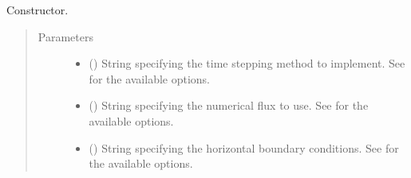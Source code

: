 \documentclass[letterpaper,10pt,english]{sphinxmanual}
\begin{document}
\begin{fulllineitems}
\begin{fulllineitems}
\end{fulllineitems}


\begin{fulllineitems}
\label{\detokenize{api:tasmania.dycore.dycore_isentropic_nonconservative.DynamicalCoreIsentropicNonconservative.__init__}}
Constructor.
\begin{quote}\begin{description}
\item[{Parameters}] \leavevmode\begin{itemize}
\item {} 
 () \textendash{} String specifying the time stepping method to implement.
See {\hyperref[\detokenize{api:tasmania.dycore.prognostic_isentropic_nonconservative.PrognosticIsentropicNonconservative}]{}}
for the available options.

\item {} 
 () \textendash{} String specifying the numerical flux to use.
See {\hyperref[\detokenize{api:tasmania.dycore.flux_isentropic_nonconservative.FluxIsentropicNonconservative}]{}}
for the available options.

\item {} 
 () \textendash{} String specifying the horizontal boundary conditions.
See {\hyperref[\detokenize{api:tasmania.dycore.horizontal_boundary.HorizontalBoundary}]{}} for the available options.


\end{itemize}
\end{description}
\end{quote}
\end{fulllineitems}
\end{fulllineitems}
\end{document}
